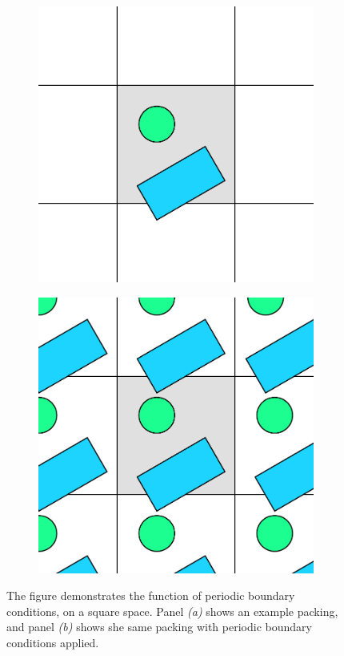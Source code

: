 \documentclass[12pt, oneside]{report}
\begin{document}
\begin{figure}[H]
  \centering

  \begin{subfigure}[b]{0.4\linewidth}
    \includegraphics[width=\linewidth,height=\linewidth]{Images/CieslaAlgorithm/pec1.pdf}
    \caption{}
  \end{subfigure}
  \begin{subfigure}[b]{0.4\linewidth}
    \includegraphics[width=\linewidth,height=\linewidth]{Images/CieslaAlgorithm/pec2.pdf}
    \caption{}
  \end{subfigure}

\caption{The figure demonstrates the function of periodic boundary conditions, on a square space. Panel \textit{(a)} shows an example packing, and panel \textit{(b)} shows she same packing with periodic boundary conditions applied.}
\end{figure}
\end{document}
